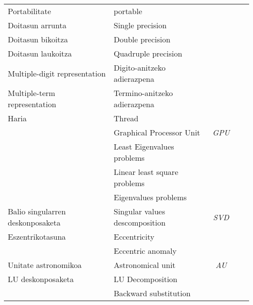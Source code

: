 \begin{table}
{\begin{tabular}{ l l c c c }
 Portabilitate                           &  portable                            &              &                  \\
 Doitasun arrunta                        &  Single precision                    &              &                  \\
 Doitasun bikoitza                       &  Double precision                    &              &                  \\
 Doitasun laukoitza                      &  Quadruple precision                 &              &                  \\
 Multiple-digit representation           &  Digito-anitzeko adierazpena         &              &                  \\
 Multiple-term representation            &  Termino-anitzeko adierazpena        &              &                  \\  
 Haria                                   &  Thread                              &              &                  \\
                                         &  Graphical Processor Unit            &  \emph{GPU}  &                  \\
                                         &  Least Eigenvalues problems          &              &                  \\
                                         &  Linear least square problems        &              &                  \\
                                         &  Eigenvalues problems                &              &                  \\
 Balio singularren deskonposaketa        &  Singular values descomposition      & \emph{SVD}   &                  \\
 Eszentrikotasuna                        &  Eccentricity                        &              &                  \\
                                         &  Eccentric anomaly                   &              &                  \\
 Unitate astronomikoa                    &  Astronomical unit                   &  \emph{AU}   &                  \\
 LU deskonposaketa                       &  LU Decomposition                    &              &                  \\
                                         &  Backward substitution               &              &                  \\

\end{tabular}}
\end{table}
